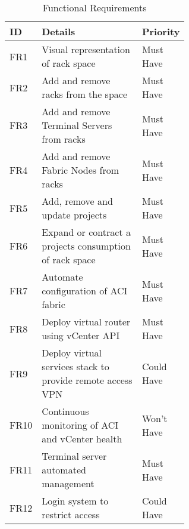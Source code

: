 \begin{center}
    \begin{table}[H]
        \begin{tabular}{l p{0.6\linewidth} l}
            \hline
            \textbf{ID} & \textbf{Details}
                        & \textbf{Priority}
            \\ \hline
            FR1         & Visual representation of rack space
                        & Must Have
            \\ \hline
            FR2         & Add and remove racks from the space
                        & Must Have
            \\ \hline
            FR3         & Add and remove Terminal Servers from racks
                        & Must Have
            \\ \hline
            FR4         & Add and remove Fabric Nodes from racks
                        & Must Have
            \\ \hline
            FR5         & Add, remove and update projects
                        & Must Have
            \\ \hline
            FR6         & Expand or contract a projects consumption of rack
            space       & Must Have
            \\ \hline
            FR7         & Automate configuration of ACI fabric
                        & Must Have
            \\ \hline
            FR8         & Deploy virtual router using vCenter API
                        & Must Have
            \\ \hline
            FR9         & Deploy virtual services stack to provide remote
            access VPN  & Could
            Have
            \\ \hline
            FR10        & Continuous monitoring of ACI and vCenter health
                        & Won’t Have
            \\
            \hline
            FR11        & Terminal server automated management
                        & Must Have
            \\ \hline
            FR12        & Login system to restrict access                   & 
            Could Have                                                         \\
        \end{tabular}
        \caption{Functional Requirements}
        \label{requirements:functional}
    \end{table}
\end{center}

